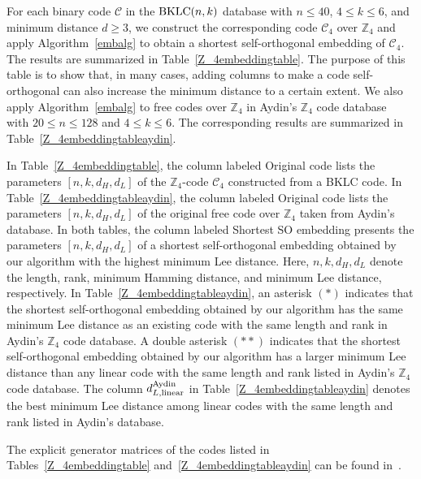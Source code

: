 \documentclass{article}
\theoremstyle{definition}
\theoremstyle{remark}
\begin{document}
For each binary code $\mathcal{C}$ in the ${\rm BKLC}(n,k)$ database with $n\le 40$, $4\le k\le 6$, and minimum distance $d\ge 3$, we construct the corresponding code $\mathcal{C}_4$ over $\mathbb{Z}_4$ and apply Algorithm~\ref{embalg} to obtain a shortest self-orthogonal embedding of $\mathcal{C}_4$. The results are summarized in Table~\ref{Z_4embeddingtable}. The purpose of this table is to show that, in many cases, adding columns to make a code self-orthogonal can also increase the minimum distance to a certain extent. We also apply Algorithm~\ref{embalg} to free codes over $\mathbb{Z}_4$ in Aydin's $\mathbb{Z}_4$ code database~\cite{AAY-web,ALO-arXiv} with $20\le n\le 128$ and $4\le k\le 6$. The corresponding results are summarized in Table~\ref{Z_4embeddingtableaydin}.

In Table~\ref{Z_4embeddingtable}, the column labeled Original code lists the parameters $[n,k,d_H,d_L]$ of the $\mathbb{Z}_4$-code $\mathcal{C}_4$ constructed from a BKLC code. In Table~\ref{Z_4embeddingtableaydin}, the column labeled Original code lists the parameters $[n,k,d_H,d_L]$ of the original free code over $\mathbb{Z}_4$ taken from Aydin's database. In both tables, the column labeled Shortest SO embedding presents the parameters $[n,k,d_H,d_L]$ of a shortest self-orthogonal embedding obtained by our algorithm with the highest minimum Lee distance. Here, $n,k,d_H,d_L$ denote the length, rank, minimum Hamming distance, and minimum Lee distance, respectively. In Table~\ref{Z_4embeddingtableaydin}, an asterisk $(*)$ indicates that the shortest self-orthogonal embedding obtained by our algorithm has the same minimum Lee distance as an existing code with the same length and rank in Aydin's $\mathbb{Z}_4$ code database. A double asterisk $(**)$ indicates that the shortest self-orthogonal embedding obtained by our algorithm has a larger minimum Lee distance than any linear code with the same length and rank listed in Aydin's $\mathbb{Z}_4$ code database. The column $d_{L, \mathrm{linear}}^{\rm Aydin}$ in Table~\ref{Z_4embeddingtableaydin} denotes the best minimum Lee distance among linear codes with the same length and rank listed in Aydin's database.

The explicit generator matrices of the codes
listed in Tables~\ref{Z_4embeddingtable} and~\ref{Z_4embeddingtableaydin}
can be found in~\cite{An-git}.
\end{document}
